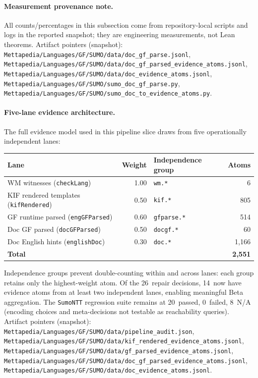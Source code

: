 \documentclass[11pt]{article}
\theoremstyle{definition}
\theoremstyle{plain}
\begin{document}
\paragraph{Measurement provenance note.}
All counts/percentages in this subsection come from repository-local scripts and
logs in the reported snapshot; they are engineering measurements, not Lean theorems.
Artifact pointers (snapshot): \texttt{Mettapedia/Languages/GF/SUMO/data/doc\_gf\_parse.jsonl},
\texttt{Mettapedia/Languages/GF/SUMO/data/doc\_gf\_parsed\_evidence\_atoms.jsonl},
\texttt{Mettapedia/Languages/GF/SUMO/data/doc\_evidence\_atoms.jsonl},
\texttt{Mettapedia/Languages/GF/SUMO/sumo\_doc\_gf\_parse.py},
\texttt{Mettapedia/Languages/GF/SUMO/sumo\_doc\_to\_evidence\_atoms.py}.

\paragraph{Five-lane evidence architecture.}
The full evidence model used in this pipeline slice draws from five operationally
independent lanes:
\begin{center}\small
\begin{tabular}{@{}lrlr@{}}
\toprule
\textbf{Lane} & \textbf{Weight} & \textbf{Independence group}
  & \textbf{Atoms} \\
\midrule
WM witnesses (\texttt{checkLang}) & 1.00 & \texttt{wm.*} & 6 \\
KIF rendered templates (\texttt{kifRendered}) & 0.50 & \texttt{kif.*} & 805 \\
GF runtime parsed (\texttt{engGFParsed}) & 0.60 & \texttt{gfparse.*} & 514 \\
Doc GF parsed (\texttt{docGFParsed}) & 0.50 & \texttt{docgf.*} & 60 \\
Doc English hints (\texttt{englishDoc}) & 0.30 & \texttt{doc.*} & 1{,}166 \\
\midrule
\textbf{Total} & & & \textbf{2{,}551} \\
\bottomrule
\end{tabular}
\end{center}

Independence groups prevent double-counting within and across
lanes: each group retains only the highest-weight atom.
Of the 26~repair decisions, 14~now have evidence atoms from
at least two independent lanes, enabling meaningful Beta
aggregation.  The \texttt{SumoNTT} regression suite remains
at 20~passed, 0~failed, 8~N/A (encoding choices and
meta-decisions not testable as reachability queries).
Artifact pointers (snapshot): \texttt{Mettapedia/Languages/GF/SUMO/data/pipeline\_audit.json},
\texttt{Mettapedia/Languages/GF/SUMO/data/kif\_rendered\_evidence\_atoms.jsonl},
\texttt{Mettapedia/Languages/GF/SUMO/data/gf\_parsed\_evidence\_atoms.jsonl},
\texttt{Mettapedia/Languages/GF/SUMO/data/doc\_gf\_parsed\_evidence\_atoms.jsonl},
\texttt{Mettapedia/Languages/GF/SUMO/data/doc\_evidence\_atoms.jsonl}.
\end{document}
